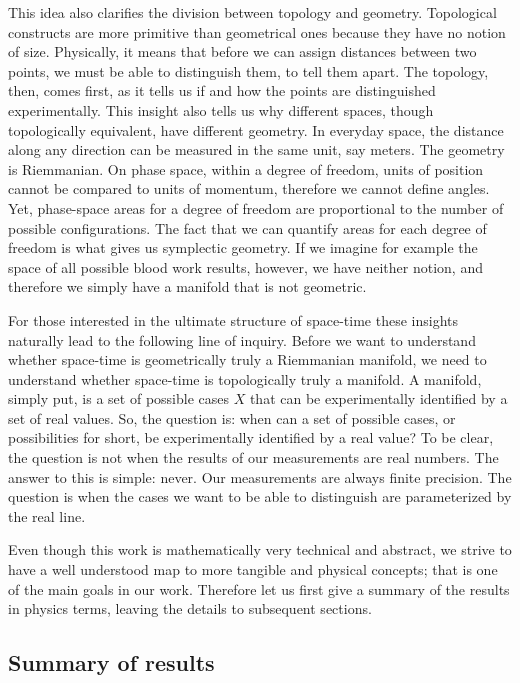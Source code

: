 \documentclass[12pt]{iopart}
\begin{document}
This idea also clarifies the division between topology and geometry. Topological constructs are more primitive than geometrical ones because they have no notion of size. Physically, it means that before we can assign distances between two points, we must be able to distinguish them, to tell them apart. The topology, then, comes first, as it tells us if and how the points are distinguished experimentally. This insight also tells us why different spaces, though topologically equivalent, have different geometry. In everyday space, the distance along any direction can be measured in the same unit, say meters. The geometry is Riemmanian. On phase space, within a degree of freedom, units of position cannot be compared to units of momentum, therefore we cannot define angles. Yet, phase-space areas for a degree of freedom are proportional to the number of possible configurations. The fact that we can quantify areas for each degree of freedom is what gives us symplectic geometry. If we imagine for example the space of all possible blood work results, however, we have neither notion, and therefore we simply have a manifold that is not geometric.

For those interested in the ultimate structure of space-time these insights naturally lead to the following line of inquiry. Before we want to understand whether space-time is geometrically truly a Riemmanian manifold, we need to understand whether space-time is topologically truly a manifold. A manifold, simply put, is a set of possible cases $X$ that can be experimentally identified by a set of real values. So, the question is: when can a set of possible cases, or possibilities for short, be experimentally identified by a real value? To be clear, the question is not when the results of our measurements are real numbers. The answer to this is simple: never. Our measurements are always finite precision. The question is when the cases we want to be able to distinguish are parameterized by the real line.

Even though this work is mathematically very technical and abstract, we strive to have a well understood map to more tangible and physical concepts; that is one of the main goals in our work. Therefore let us first give a summary of the results in physics terms, leaving the details to subsequent sections.

\subsection{Summary of results}
\end{document}
